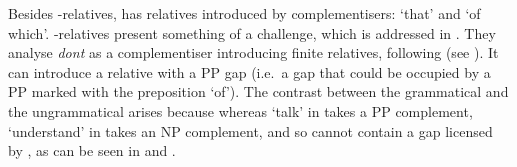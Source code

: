 \documentclass[output=paper
 	        ,biblatex
                ,babelshorthands
                ,newtxmath
                ,draftmode
                ,colorlinks, citecolor=brown
]{langscibook}
\begin{document}
Besides -relatives,  has relatives introduced by complementisers:
 `that' and  `of which'. -relatives present
something of a challenge, which is addressed in . They analyse \emph{dont} as a complementiser introducing finite relatives, following \citet{godard92f}
(see \eguk \citealt[Section~2.1]{AG2007a-u}). It can introduce a relative with a PP gap (i.e.\ a gap
that could be occupied by a PP marked with the preposition
 `of'). The contrast between the grammatical  and the
ungrammatical  arises because whereas  `talk' in  takes
a PP complement,  `understand' in
 takes an NP complement, and so cannot contain a gap licensed by
, as can be seen in  and .
\begin{exe}\ex\begin{xlist}\label{x:rc-69}
  \label{x:rc-70}
  \label{x:rc-71}
\end{xlist}\end{exe}
\begin{exe}\ex\begin{xlist}\label{x:rc-168}
  \label{x:rc-169}
  \label{x:rc-170}
\end{xlist}\end{exe}
\end{document}
